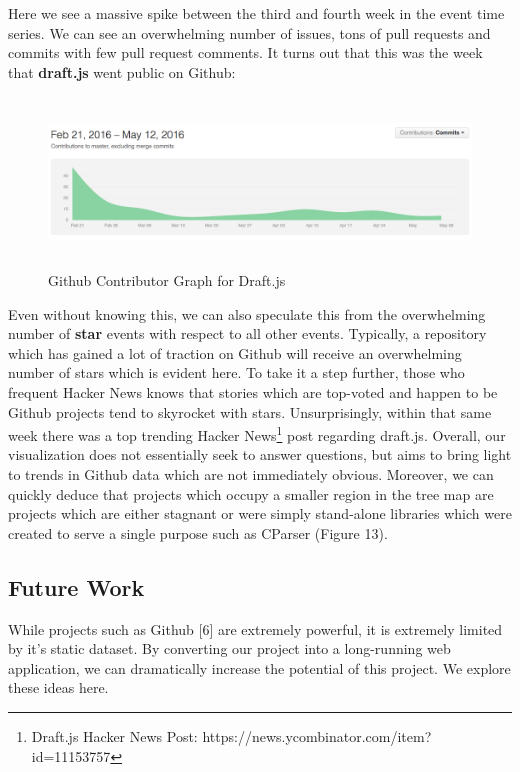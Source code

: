 \documentclass{article}
\begin{document}
Here we see a massive spike between the third and fourth week in the event time series. We can see an overwhelming number of issues, tons of pull requests and commits with few pull request comments. It turns out that this was the week that \textbf{draft.js} went public on Github:

\begin{figure}[h!]
\centering
\includegraphics[height=4.5cm, width=17cm]{graph}
\caption{Github Contributor Graph for Draft.js}
\end{figure}

Even without knowing this, we can also speculate this from the overwhelming number of \textbf{star} events with respect to all other events. Typically, a repository which has gained a lot of traction on Github will receive an overwhelming number of stars which is evident here. To take it a step further, those who frequent Hacker News knows that stories which are top-voted and happen to be Github projects tend to skyrocket with stars. Unsurprisingly, within that same week there was a top trending Hacker News\footnote{Draft.js Hacker News Post: https://news.ycombinator.com/item?id=11153757} post regarding draft.js. Overall, our visualization does not essentially seek to answer questions, but aims to bring light to trends in Github data which are not immediately obvious. Moreover, we can quickly deduce that projects which occupy a smaller region in the tree map are projects which are either stagnant or were simply stand-alone libraries which were created to serve a single purpose such as CParser (Figure 13). 

\subsection {Future Work}

While projects such as Github [6] are extremely powerful, it is extremely limited by it's static dataset. By converting our project into a long-running web application, we can dramatically increase the potential of this project. We explore these ideas here.
\end{document}
